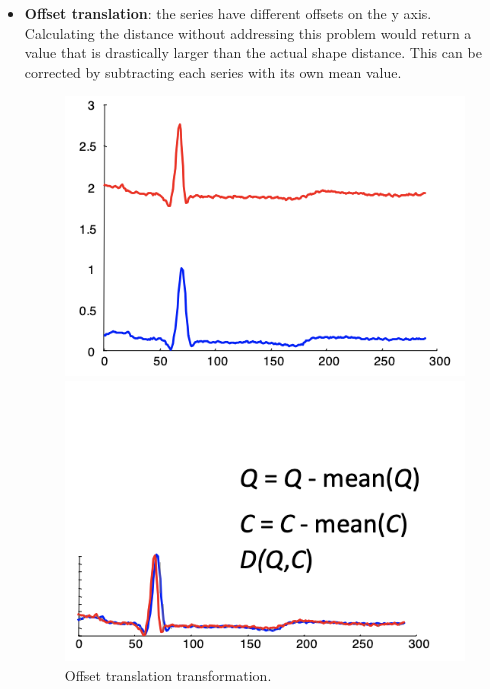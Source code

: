 \begin{itemize}
    \item \textbf{Offset translation}: the series have different offsets on the y axis. Calculating the distance without addressing this problem would return a value that is drastically larger than the actual shape distance. This can be corrected by subtracting each series with its own mean value.
    \begin{figure}[h]
        \centering
        \begin{minipage}{0.40\textwidth}
         \includegraphics[width=1.0\linewidth]{img/offset_trans_1.png}
        \end{minipage}
        \hfill
        \begin{minipage}{0.40\textwidth}
            \includegraphics[width=1.0\linewidth]{img/offset_trans_2.png}
        \end{minipage}
        \label{fig:offset-trans}
        \caption{Offset translation transformation.}
    \end{figure}


\end{itemize}
